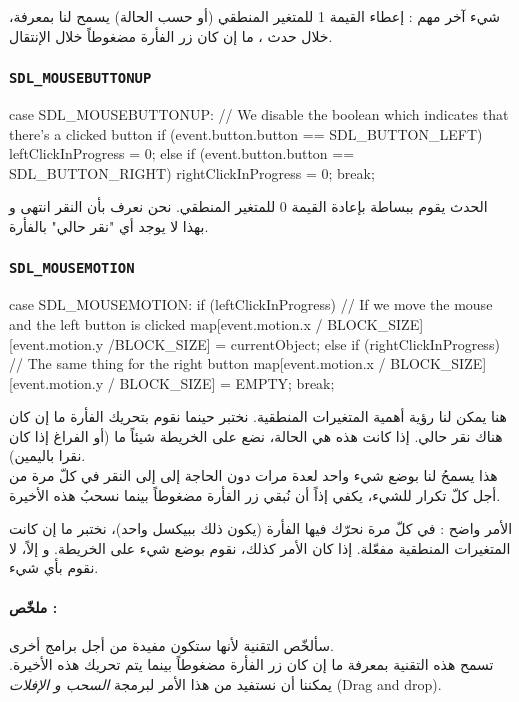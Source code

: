 شيء آخر مهم : إعطاء القيمة 1 للمتغير المنطقي
(أو
حسب الحالة) يسمح لنا بمعرفة، خلال حدث
،
ما إن كان زر الفأرة مضغوطاً خلال الإنتقال.

\subsubsection{\texttt{SDL\_MOUSEBUTTONUP}}

\begin{Csource}
case SDL_MOUSEBUTTONUP: // We disable the boolean which indicates that there's a clicked button
if (event.button.button == SDL_BUTTON_LEFT)
	leftClickInProgress = 0;
else if (event.button.button == SDL_BUTTON_RIGHT)
	rightClickInProgress = 0;
break;
\end{Csource}

الحدث
يقوم ببساطة بإعادة القيمة 0 للمتغير المنطقي. نحن نعرف بأن النقر انتهى و بهذا لا يوجد أي "نقر حالي" بالفأرة.

\subsubsection{\texttt{SDL\_MOUSEMOTION}}

\begin{Csource}
case SDL_MOUSEMOTION:
if (leftClickInProgress) // If we move the mouse and the left button is clicked
{
	map[event.motion.x / BLOCK_SIZE][event.motion.y /BLOCK_SIZE] = currentObject;
}
else if (rightClickInProgress) // The same thing for the right button
{
	map[event.motion.x / BLOCK_SIZE][event.motion.y / BLOCK_SIZE] = EMPTY;
}
break;
\end{Csource}

هنا يمكن لنا رؤية أهمية المتغيرات المنطقية. نختبر حينما نقوم بتحريك الفأرة ما إن كان هناك نقر حالي. إذا كانت هذه هي الحالة، نضع على الخريطة شيئاً ما (أو الفراغ إذا كان نقرا باليمين).\\
هذا يسمحُ لنا بوضع شيء واحد لعدة مرات دون الحاجة إلى إلى النقر في كلّ مرة من أجل كلّ تكرار للشيء، يكفي إذاً أن نُبقي زر الفأرة مضغوطاً بينما نسحبُ هذه الأخيرة.

الأمر واضح : في كلّ مرة نحرّك فيها الفأرة (يكون ذلك ببيكسل واحد)، نختبر ما إن كانت المتغيرات المنطقية مفعّلة. إذا كان الأمر كذلك، نقوم بوضع شيء على الخريطة. و إلاً، لا نقوم بأي شيء.

\paragraph{ملخّص :}
سألخّص التقنية لأنها ستكون مفيدة من أجل برامج أخرى.\\
تسمح هذه التقنية بمعرفة ما إن كان زر الفأرة مضغوطاً بينما يتم تحريك هذه الأخيرة. يمكننا أن نستفيد من هذا الأمر لبرمجة
\textit{السحب و الإفلات}
(\textenglish{Drag and drop}).

